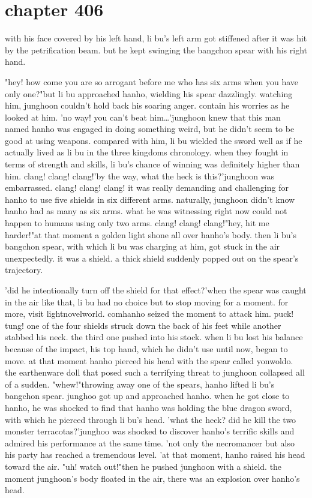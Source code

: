 \section{chapter 406}

with his face covered by his left hand, li bu's left arm got stiffened after it was hit by the petrification beam.
 but he kept swinging the bangchon spear with his right hand.





"hey! how come you are so arrogant before me who has six arms when you have only one?"but li bu approached hanho, wielding his spear dazzlingly.
watching him, junghoon couldn't hold back his soaring anger.
contain his worries as he looked at him.
'no way! you can't beat him…'junghoon knew that this man named hanho was engaged in doing something weird, but he didn't seem to be good at using weapons.
compared with him, li bu wielded the sword well as if he actually lived as li bu in the three kingdoms chronology.
when they fought in terms of strength and skills, li bu's chance of winning was definitely higher than him.
clang! clang! clang!'by the way, what the heck is this?'junghoon was embarrassed.
clang! clang! clang! it was really demanding and challenging for hanho to use five shields in six different arms.
 naturally, junghoon didn't know hanho had as many as six arms.
 what he was witnessing right now could not happen to humans using only two arms.
clang! clang! clang!"hey, hit me harder!"at that moment a golden light shone all over hanho's body.
 then li bu's bangchon spear, with which li bu was charging at him, got stuck in the air unexpectedly.
 it was a shield.
 a thick shield suddenly popped out on the spear's trajectory.

'did he intentionally turn off the shield for that effect?'when the spear was caught in the air like that, li bu had no choice but to stop moving for a moment.
for more, visit lightnovelworld.
comhanho seized the moment to attack him.
puck! tung! one of the four shields struck down the back of his feet while another stabbed his neck.
 the third one pushed into his stock.
 when li bu lost his balance because of the impact, his top hand, which he didn't use until now, began to move.
at that moment hanho pierced his head with the spear called yonwoldo.
 the earthenware doll that posed such a terrifying threat to junghoon collapsed all of a sudden.
"whew!"throwing away one of the spears, hanho lifted li bu's bangchon spear.
 junghoo got up and approached hanho.
when he got close to hanho, he was shocked to find that hanho was holding the blue dragon sword, with which he pierced through li bu's head.
'what the heck? did he kill the two monster terracotas?'junghoo was shocked to discover hanho's terrific skills and admired his performance at the same time.
'not only the necromancer but also his party has reached a tremendous level.
'at that moment, hanho raised his head toward the air.
"uh! watch out!"then he pushed junghoon with a shield.
 the moment junghoon's body floated in the air, there was an explosion over hanho's head.

